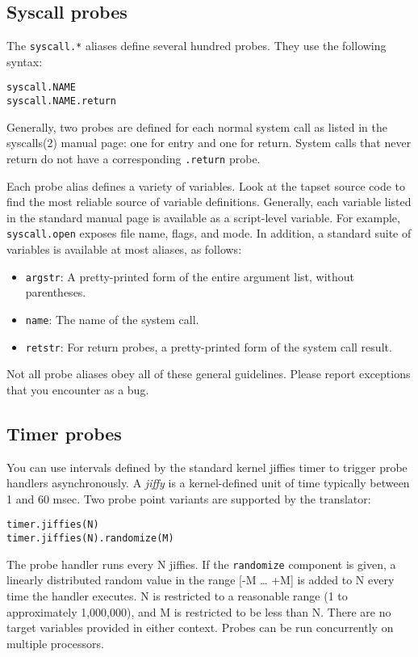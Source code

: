 \documentclass[twoside,english]{article}
\newenvironment{vindent}
{\begin{list}{}{\setlength{\listparindent}{6pt}}
\item[]}
{\end{list}}
\begin{document}
\subsection{Syscall probes}
\label{sec:syscall}
The \texttt{syscall.*}  aliases define several hundred probes.  They
use the following syntax:
\begin{vindent}
\begin{verbatim}
syscall.NAME
syscall.NAME.return
\end{verbatim}
\end{vindent}

Generally, two probes are defined for each normal system call as
listed in the syscalls(2) manual page: one for entry and one for
return.   System calls that never return do not have a
corresponding \texttt{.return} probe.

Each probe alias defines a variety of variables. Look at the tapset
source code to find the most reliable source of variable definitions.
Generally, each variable listed in the standard manual page is
available as a script-level variable. For example,
\texttt{syscall.open} exposes file name, flags, and mode.  In addition,
a standard suite of variables is available at most aliases, as follows:

\begin{itemize}
\item \texttt{argstr}: A pretty-printed form of the entire argument
  list, without parentheses.
\item \texttt{name}: The name of the system call.
\item \texttt{retstr}: For return probes, a pretty-printed form of the
  system call result.
\end{itemize}

Not all probe aliases obey all of these general guidelines.  Please
report exceptions that you encounter as a bug.


\subsection{Timer probes}
You can use intervals defined by the standard kernel jiffies
timer to trigger probe handlers asynchronously. A \emph{jiffy} is a kernel-defined
unit of time typically between 1 and 60 msec. Two probe point variants are
supported by the translator:

\begin{vindent}
\begin{verbatim}
timer.jiffies(N)
timer.jiffies(N).randomize(M)
\end{verbatim}
\end{vindent}
The probe handler runs every N jiffies. If the \texttt{randomize}
component is given, a linearly distributed random value in the range {[}-M
\ldots{} +M] is added to N every time the handler executes. N is restricted
to a reasonable range (1 to approximately 1,000,000), and M is restricted
to be less than N. There are no target variables provided in either context.
Probes can be run concurrently on multiple processors.
\end{document}
